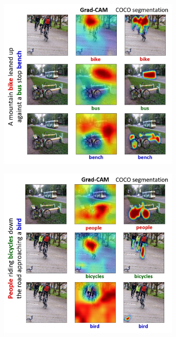 \begin{figure}[h]
\begin{center}
\begin{subfigure}[t]{\columnwidth}
\hspace{-20pt}
\includegraphics[scale=0.25]{figures/bike_bus_bench_show_tell.jpg}\caption{}
\vspace{10pt}
\end{subfigure}
\begin{subfigure}[t]{\columnwidth}
\includegraphics[scale=0.25]{figures/people_bicycles_bird_show_tell.jpg}\caption{}
\vspace{10pt}


\end{subfigure}
\end{center}
\end{figure}
